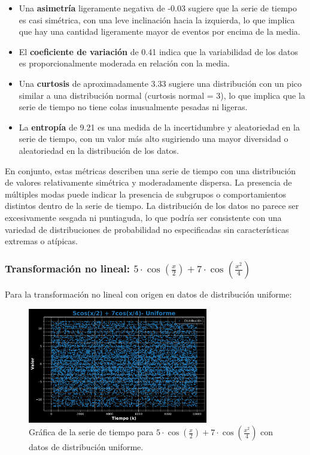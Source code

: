 \documentclass[11pt]{article} %
\begin{document}
\begin{itemize}
		\item Una \textbf{asimetría} ligeramente negativa de -0.03 sugiere que la serie de tiempo es casi simétrica, con una leve inclinación hacia la izquierda, lo que implica que hay una cantidad ligeramente mayor de eventos por encima de la media.
		
		\item El \textbf{coeficiente de variación} de 0.41 indica que la variabilidad de los datos es proporcionalmente moderada en relación con la media.
		
		\item Una \textbf{curtosis} de aproximadamente 3.33 sugiere una distribución con un pico similar a una distribución normal (curtosis normal = 3), lo que implica que la serie de tiempo no tiene colas inusualmente pesadas ni ligeras.
		
		\item La \textbf{entropía} de 9.21 es una medida de la incertidumbre y aleatoriedad en la serie de tiempo, con un valor más alto sugiriendo una mayor diversidad o aleatoriedad en la distribución de los datos.
	\end{itemize}
	
	En conjunto, estas métricas describen una serie de tiempo con una distribución de valores relativamente simétrica y moderadamente dispersa. La presencia de múltiples modas puede indicar la presencia de subgrupos o comportamientos distintos dentro de la serie de tiempo. La distribución de los datos no parece ser excesivamente sesgada ni puntiaguda, lo que podría ser consistente con una variedad de distribuciones de probabilidad no especificadas sin características extremas o atípicas.
	
	\newpage
	\subsubsection{Transformación no lineal: \( 5\cdot \cos\left(\frac{x}{2}\right) + 7\cdot \cos\left(\frac{x^2}{4}\right) \)
	}
	
	Para la transformación no lineal con origen en datos de distribución uniforme:
	\begin{figure}[h]
		\centering
		\includegraphics[width=0.7\textwidth]{../transformaciones/per_uniforme1.pdf}
		\caption{Gráfica de la serie de tiempo para \( 5\cdot \cos\left(\frac{x}{2}\right) + 7\cdot \cos\left(\frac{x^2}{4}\right) \) con datos de distribución uniforme.}
		\label{fig:perUnifGraf}
	\end{figure}
	
\end{document}
